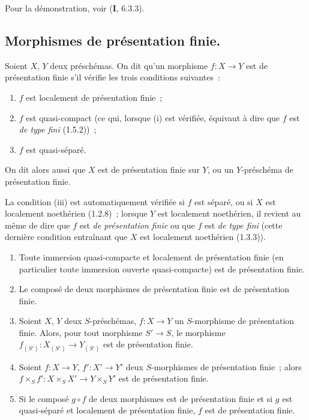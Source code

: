 Pour la démonstration, voir (\textbf{I}, 6.3.3).

\subsection{Morphismes de présentation finie.}
\label{subsection:IV.1.6-fr}

\begin{definition}[1.6.1]
\label{IV.1.6.1-fr}
Soient $X$, $Y$ deux préschémas. On dit qu'un morphisme $f:X\to Y$ est
de présentation finie s'il vérifie les trois conditions suivantes~:
\begin{enumerate}
  \item[\textup{(i)}] $f$ est localement de présentation finie~;
  \item[\textup{(ii)}] $f$ est quasi-compact \textup{(ce qui, lorsque (i) est vérifiée,
  équivaut à dire que $f$ est \emph{de type fini} (1.5.2))}~;
  \item[\textup{(iii)}] $f$ est quasi-séparé.
\end{enumerate}
On dit alors aussi que $X$ est de présentation finie sur $Y$, ou un
$Y$-préschéma de présentation finie.
\end{definition}

La condition (iii) est automatiquement vérifiée si $f$ est séparé, ou si $X$
est localement noethérien (1.2.8)~; lorsque $Y$ est localement noethérien, il
revient au même de dire que $f$ est \emph{de présentation finie} ou que $f$
est \emph{de type fini} (cette dernière condition entraînant que $X$ est
localement noethérien (1.3.3)).


\begin{proposition}[1.6.2]
\label{IV.1.6.2-fr}
\begin{enumerate}
  \item[\textup{(i)}] Toute immersion quasi-compacte et localement de présentation
  finie (en particulier toute immersion ouverte quasi-compacte) est de
  présentation finie.
  \item[\textup{(ii)}] Le composé de deux morphismes de présentation finie est de
  présentation finie.
  \item[\textup{(iii)}] Soient $X$, $Y$ deux $S$-préschémas, $f:X\to Y$ un
  $S$-morphisme de présentation finie. Alors, pour tout morphisme $S'\to S$,
  le morphisme $f_{(S')}:X_{(S')}\to Y_{(S')}$ est de présentation finie.
  \item[\textup{(iv)}] Soient $f:X\to Y$, $f':X'\to Y'$ deux $S$-morphismes de
  présentation finie~; alors
  $f\times_Sf':X\times_SX'\to Y\times_SY'$ est de présentation finie.
  \item[\textup{(v)}] Si le composé $g\circ f$ de deux morphismes est de présentation
  finie et si $g$ est quasi-séparé et localement de présentation finie, $f$
  est de présentation finie.
\end{enumerate}
\end{proposition}

